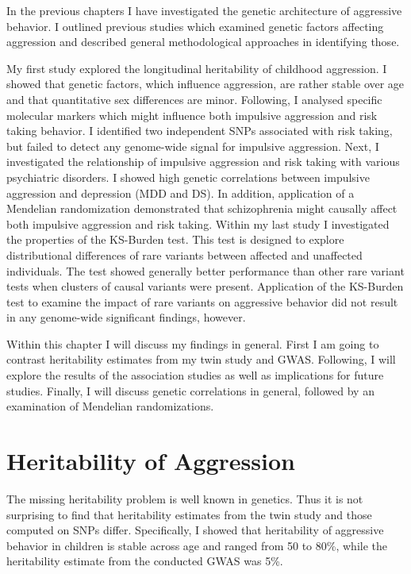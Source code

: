 
In the previous chapters I have investigated the genetic architecture of aggressive behavior.
I outlined previous studies which examined genetic factors affecting aggression and described general methodological approaches in identifying those.

My first study explored the longitudinal heritability of childhood aggression.
I showed that genetic factors, which influence aggression, are rather stable over age and that quantitative sex differences are minor.
Following, I analysed specific molecular markers which might influence both impulsive aggression and risk taking behavior.
I identified two independent SNPs associated with risk taking, but failed to detect any genome-wide signal for impulsive aggression.
Next, I investigated the relationship of impulsive aggression and risk taking with various psychiatric disorders.
I showed  high genetic correlations between impulsive aggression and depression (MDD and DS).
In addition, application of a Mendelian randomization demonstrated that schizophrenia might causally affect both impulsive aggression and risk taking.
Within my last study I investigated the properties of the KS-Burden test.
This test is designed to explore distributional differences of rare variants between affected and unaffected individuals.
The test showed generally better performance than other rare variant tests when clusters of causal variants were present.
Application of the KS-Burden test to examine the impact of rare variants on aggressive behavior did not result in any genome-wide significant findings, however.

Within this chapter I will discuss my findings in general.
First I am going to contrast heritability estimates from  my twin study and GWAS\@.
Following, I will explore the results of the association studies as well as implications for future studies.
Finally, I will discuss genetic correlations in general, followed by an examination of Mendelian randomizations.

\section{Heritability of Aggression}
\label{sec:heritability_of_aggression}

The missing heritability problem is well known in genetics.
Thus it is not surprising to find that heritability estimates from the twin study and those computed on SNPs differ.
Specifically, I showed that heritability of aggressive behavior in children is stable across age and ranged from 50 to 80\%, while the heritability estimate from the conducted GWAS was 5\%. 

